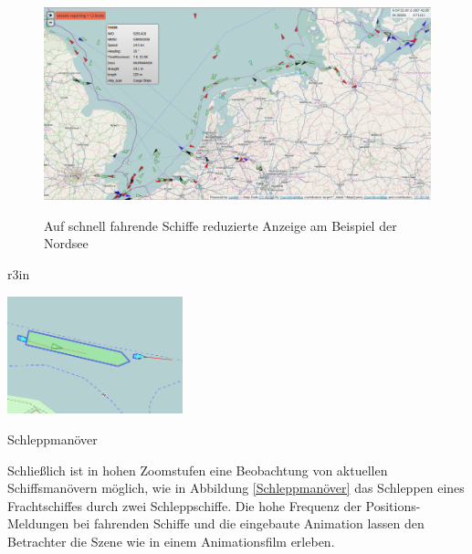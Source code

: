 \begin {figure}[H]
\begin{center}
  \includegraphics[width=6in]{images/zoomout.png}
\end{center}
\caption{Auf schnell fahrende Schiffe reduzierte Anzeige am Beispiel der Nordsee}
\label{Nordsee}
\end {figure}

\begin {wrapfigure}[9]{r}{3in}
\begin{center}
  \includegraphics[width=2in]{images/Schleppen.png}
 \caption{Schleppmanöver}
  \end{center}
 \label{Schleppmanöver}

\end {wrapfigure}

Schließlich ist in hohen Zoomstufen eine Beobachtung von aktuellen Schiffsmanövern möglich, wie in Abbildung \ref{Schleppmanöver} das Schleppen eines Frachtschiffes durch zwei Schleppschiffe. Die hohe Frequenz der Positions-Meldungen bei fahrenden Schiffe und die eingebaute Animation lassen den Betrachter die Szene wie in einem Animationsfilm erleben.\\
